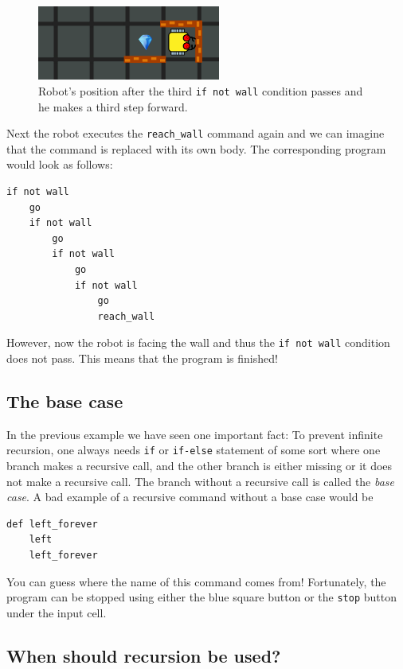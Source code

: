{{{{\begin{figure}[!ht]
\begin{center}
\includegraphics[width=6cm]{imgk/rec-4.png}
\end{center}
\vspace{-4mm}
\caption{Robot's position after the third {\tt if not wall} condition passes and he makes a third step forward.}
\label{fig:rec4}
\end{figure}
\noindent
Next the robot executes the {\tt reach\_wall} command again and we can imagine that the command 
is replaced with its own body. The corresponding program would look as follows:

\begin{verbatim}
if not wall
    go
    if not wall
        go
        if not wall
            go
            if not wall
                go
                reach_wall
\end{verbatim}
\noindent
However, now the robot is facing the wall and thus the {\tt if not wall} condition does not pass.  
This means that the program is finished!

\subsection{The base case}

In the previous example we have seen one important fact: To prevent infinite recursion, one always needs {\tt if} or {\tt if-else} 
statement of some sort where one branch makes a recursive call, and the other branch is either 
missing or it does not make a recursive call. The branch without a recursive 
call is called the {\em base case}. A bad example of a recursive command without a base case would be 

\begin{verbatim}
def left_forever
    left
    left_forever
\end{verbatim}
\noindent
You can guess where the name of this command comes from! Fortunately, the program can be stopped using 
either the blue square button or the {\tt stop} button under the input cell.

\subsection{When should recursion be used?}

}}}}
